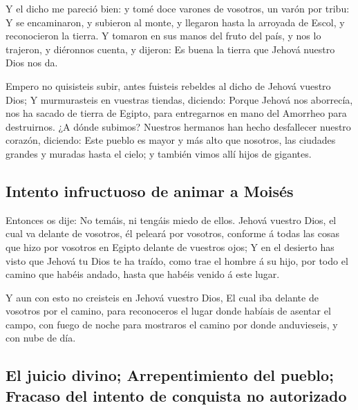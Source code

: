  Y el dicho me pareció bien: y tomé doce varones de
vosotros, un varón por tribu:  Y se encaminaron, y subieron
al monte, y llegaron hasta la arroyada de Escol, y reconocieron la
tierra.  Y tomaron en sus manos del fruto del país, y nos
lo trajeron, y diéronnos cuenta, y dijeron: Es buena la tierra que
Jehová nuestro Dios nos da.

 Empero no quisisteis subir, antes fuisteis rebeldes al
dicho de Jehová vuestro Dios;  Y murmurasteis en vuestras
tiendas, diciendo: Porque Jehová nos aborrecía, nos ha sacado de tierra
de Egipto, para entregarnos en mano del Amorrheo para destruirnos.
 ¿A dónde subimos? Nuestros hermanos han hecho desfallecer
nuestro corazón, diciendo: Este pueblo es mayor y más alto que nosotros,
las ciudades grandes y muradas hasta el cielo; y también vimos allí
hijos de gigantes.

\hypertarget{intento-infructuoso-de-animar-a-moisuxe9s}{%
\subsection{Intento infructuoso de animar a
Moisés}\label{intento-infructuoso-de-animar-a-moisuxe9s}}

 Entonces os dije: No temáis, ni tengáis miedo de ellos.
 Jehová vuestro Dios, el cual va delante de vosotros, él
peleará por vosotros, conforme á todas las cosas que hizo por vosotros
en Egipto delante de vuestros ojos;  Y en el desierto has
visto que Jehová tu Dios te ha traído, como trae el hombre á su hijo,
por todo el camino que habéis andado, hasta que habéis venido á este
lugar.

 Y aun con esto no creisteis en Jehová vuestro Dios,
 El cual iba delante de vosotros por el camino, para
reconoceros el lugar donde habíais de asentar el campo, con fuego de
noche para mostraros el camino por donde anduvieseis, y con nube de día.

\hypertarget{el-juicio-divino-arrepentimiento-del-pueblo-fracaso-del-intento-de-conquista-no-autorizado}{%
\subsection{El juicio divino; Arrepentimiento del pueblo; Fracaso del
intento de conquista no
autorizado}\label{el-juicio-divino-arrepentimiento-del-pueblo-fracaso-del-intento-de-conquista-no-autorizado}}

